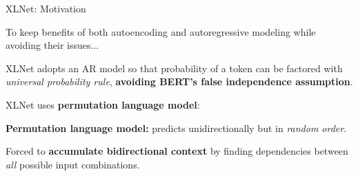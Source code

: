 \begin{frame}{XLNet: Motivation}

    \footnotesize 
    
    To keep benefits of both autoencoding and autoregressive modeling while avoiding their issues...
    
    \begin{enumerateSpaced}{7pt}
    
        \footnotesize  
    
        \item XLNet adopts an AR model so that probability of a token can be factored with \emph{universal probability rule}, {\color{DodgerBlue}  \textbf{avoiding BERT's false independence assumption}}. 
        
        \item XLNet uses \textbf{permutation language model}:
        
        \begin{itemizeSpaced}{15pt}
            
            \footnotesize  
            
            \item \textbf{Permutation language model:} predicts unidirectionally but in \emph{random order}. 
            
            \item Forced to {\color{DodgerBlue} \textbf{accumulate bidirectional context}} by finding dependencies between \emph{all} possible input combinations.
        \end{itemizeSpaced}
        
        
    \end{enumerateSpaced}
    
\end{frame}


% 
%     
%     
%     
%     
% 
%     
%     
%     


